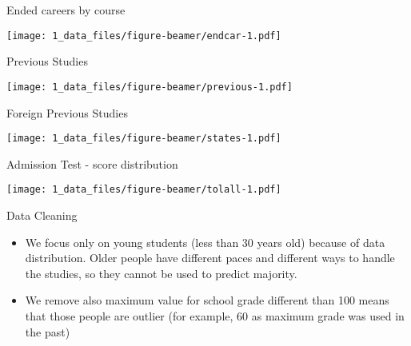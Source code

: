 \documentclass[
  ignorenonframetext,
]{beamer}
\begin{document}
\begin{frame}{Ended careers by course}
\protect\hypertarget{ended-careers-by-course}{}

\texttt{[image: 1\_data\_files/figure-beamer/endcar-1.pdf]}

\end{frame}

\begin{frame}{Previous Studies}
\protect\hypertarget{previous-studies}{}

\texttt{[image: 1\_data\_files/figure-beamer/previous-1.pdf]}

\end{frame}

\begin{frame}{Foreign Previous Studies}
\protect\hypertarget{foreign-previous-studies}{}

\texttt{[image: 1\_data\_files/figure-beamer/states-1.pdf]}

\end{frame}

\begin{frame}{Admission Test - score distribution}
\protect\hypertarget{admission-test---score-distribution}{}

\texttt{[image: 1\_data\_files/figure-beamer/tolall-1.pdf]}

\end{frame}

\begin{frame}{Data Cleaning}
\protect\hypertarget{data-cleaning}{}

\begin{itemize}
\item
  We focus only on young students (less than 30 years old) because of
  data distribution. Older people have different paces and different
  ways to handle the studies, so they cannot be used to predict
  majority.
\item
  We remove also maximum value for school grade different than 100 means
  that those people are outlier (for example, 60 as maximum grade was
  used in the past)
\end{itemize}

\end{frame}
\end{document}
